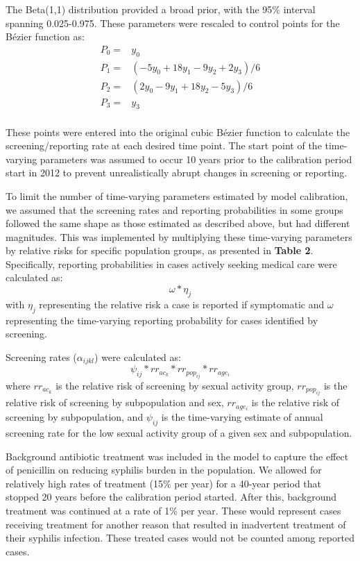 \documentclass[a4paper]{article}
\begin{document}
The Beta(1,1) distribution provided a broad prior, with the 95\% interval spanning 0.025-0.975. These parameters were rescaled to control points for the B\'ezier function as: 
\begin{equation*}\label{5}
\begin{aligned}
P_0 = {} & y_0 \\
P_1 = {} & (-5 y_0 +18 y_1 - 9 y_2 + 2 y_3)/6\\
P_2 = {} & (2 y_0 -9 y_1 + 18 y_2 - 5 y_3)/6\\
P_3 = {} & y_3 \\
\end{aligned}
\end{equation*}

These points were entered into the original cubic B\'ezier function to calculate the screening/reporting rate at each desired time point. The start point of the time-varying parameters was assumed to occur 10 years prior to the calibration period start in 2012 to prevent unrealistically abrupt changes in screening or reporting. 

To limit the number of time-varying parameters estimated by model calibration, we assumed that the screening rates and reporting probabilities in some groups followed the same shape as those estimated as described above, but had different magnitudes. This was implemented by multiplying these time-varying parameters by relative risks for specific population groups, as presented in \textbf{Table 2}. Specifically, reporting probabilities in cases actively seeking medical care were calculated as:
\[\omega * \eta_j\] with $\eta_j$ representing the relative risk a case is reported if symptomatic and $\omega$ representing the time-varying reporting probability for cases identified by screening. 

Screening rates ($\alpha_{ijkl}$) were calculated as: 
\[ \psi_{ij} * rr_{ac_{k}} *  rr_{pop_{ij}} * rr_{age_{i}} \] where $rr_{ac_{k}}$ is the relative risk of screening by sexual activity group, $rr_{pop_{ij}}$ is the relative risk of screening by subpopulation and sex,  $rr_{age_{i}}$ is the relative risk of screening by subpopulation, and $\psi_{ij}$ is the time-varying estimate of annual screening rate for the low sexual activity group of a given sex and subpopulation.  

Background antibiotic treatment was included in the model to capture the effect of penicillin on reducing syphilis burden in the population. We allowed for relatively high rates of treatment (15\% per year) for a 40-year period that stopped 20 years before the calibration period started. After this, background treatment was continued at a rate of 1\% per year. These would represent cases receiving treatment for another reason that resulted in inadvertent treatment of their syphilis infection. These treated cases would not be counted among reported cases.
\end{document}
